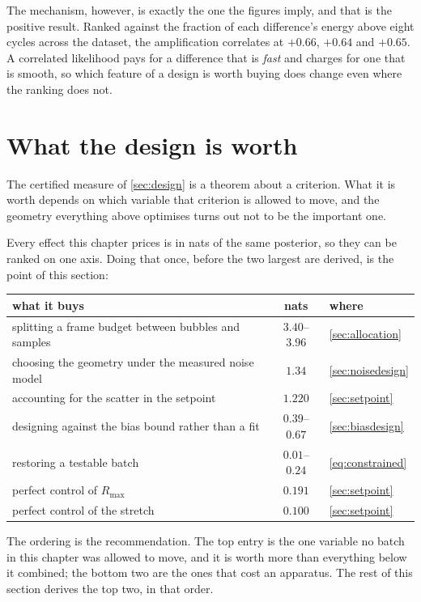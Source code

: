 \documentclass[10pt]{article}
\begin{document}
The mechanism, however, is exactly the one the figures imply, and that is the positive result.
Ranked against the fraction of each difference's energy above eight cycles across the dataset, the
amplification correlates at $+0.66$, $+0.64$ and $+0.65$. A correlated likelihood pays for a
difference that is \emph{fast} and charges for one that is smooth, so which feature of a design
is worth buying does change even where the ranking does not.

\section{What the design is worth}
\label{sec:survives}

The certified measure of \cref{sec:design} is a theorem about a criterion. What it is
worth depends on which variable that criterion is allowed to move, and the geometry
everything above optimises turns out not to be the important one.

Every effect this chapter prices is in nats of the same posterior, so they can be ranked on one
axis. Doing that once, before the two largest are derived, is the point of this section:

\begin{center}
\begin{tabular}{lcl}
\toprule
what it buys & nats & where \\
\midrule
splitting a frame budget between bubbles and samples & $\mathbf{3.40}$--$\mathbf{3.96}$
  & \cref{sec:allocation} \\
choosing the geometry under the measured noise model & $1.34$ & \cref{sec:noisedesign} \\
accounting for the scatter in the setpoint & $1.220$ & \cref{sec:setpoint} \\
designing against the bias bound rather than a fit & $0.39$--$0.67$ & \cref{sec:biasdesign} \\
restoring a testable batch & $0.01$--$0.24$ & \eqref{eq:constrained} \\
perfect control of $R_{\max}$ & $0.191$ & \cref{sec:setpoint} \\
perfect control of the stretch & $0.100$ & \cref{sec:setpoint} \\
\bottomrule
\end{tabular}
\end{center}

\noindent The ordering is the recommendation. The top entry is the one variable no batch in this
chapter was allowed to move, and it is worth more than everything below it combined; the bottom
two are the ones that cost an apparatus. The rest of this section derives the top two, in that
order.
\end{document}
